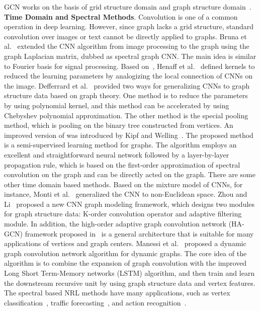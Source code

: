 GCN works on the basis of grid structure domain and graph structure domain~.
\textbf{Time Domain and Spectral Methods}. Convolution is one of a common operation in deep learning. However, since graph lacks a grid structure, standard convolution over images or text cannot be directly applied to graphs. Bruna et al.~ extended the CNN algorithm from image processing to the graph using the graph Laplacian matrix, dubbed as spectral graph CNN. The main idea is similar to Fourier basis for signal processing. Based on~, Henaff et al.~ defined kernels to reduced the learning parameters by analogizing the local connection of CNNs on the image. Defferrard et al.~ provided two ways for generalizing CNNs to graph structure data based on graph theory. One method is to reduce the parameters by using polynomial kernel, and this method can be accelerated by using Chebyshev polynomial approximation. The other method is the special pooling method, which is pooling on the binary tree constructed from vertices. An improved version of  was introduced by Kipf and Welling~. The proposed method is a semi-supervised learning method for graphs. The algorithm employs an excellent and straightforward neural network followed by a layer-by-layer propagation rule, which is based on the first-order approximation of spectral convolution on the graph and can be directly acted on the graph.
There are some other time domain based methods. Based on the mixture model of CNNs, for instance, Monti et al.~ generalized the CNN to non-Euclidean space. Zhou and Li~ proposed a new CNN graph modeling framework, which designs two modules for graph structure data: K-order convolution operator and adaptive filtering module. In addition, the high-order adaptive graph convolution network (HA-GCN) framework proposed in~ is a general architecture that is suitable for many applications of vertices and graph centers. Manessi et al.~ proposed a dynamic graph convolution network algorithm for dynamic graphs. The core idea of the algorithm is to combine the expansion of graph convolution with the improved Long Short Term-Memory networks (LSTM) algorithm, and then train and learn the downstream recursive unit by using graph structure data and vertex features. The spectral based NRL methods have many applications, such as vertex classification~, traffic forecasting~, and action recognition~.
